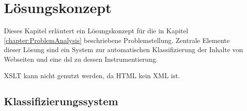 \chapter{Lösungskonzept}
    \label{chapter:SolutionConcept}
    Dieses Kapitel erläutert ein Lösungskonzept für die in Kapitel \ref{chapter:ProblemAnalysis} beschriebene Problemstellung.
    Zentrale Elemente dieser Lösung sind ein System zur automatischen Klassifizierung der Inhalte von Webseiten
    und eine \gls{dsl} zu dessen Instrumentierung.

    XSLT kann nicht genutzt werden, da HTML kein XML ist.







    \section{Klassifizierungssystem}